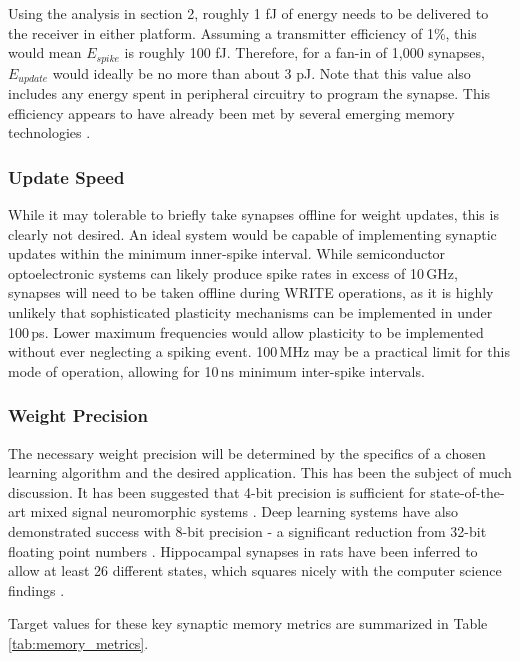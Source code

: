 \documentclass[twocolumn]{article}
\begin{document}
Using the analysis in section 2, roughly 1 fJ of energy needs to be delivered to the receiver in either platform. Assuming a transmitter efficiency of 1\%, this would mean $E_{spike}$ is roughly 100 fJ. Therefore, for a fan-in of 1,000 synapses, $E_{update}$ would ideally be no more than about 3 pJ. Note that this value also includes any energy spent in peripheral circuitry to program the synapse. This efficiency appears to have already been met by several emerging memory technologies \cite{zahoor2020resistive}.

\subsubsection{Update Speed}
While it may tolerable to briefly take synapses offline for weight updates, this is clearly not desired. An ideal system would be capable of implementing synaptic updates within the minimum inner-spike interval. While semiconductor optoelectronic systems can likely produce spike rates in excess of 10\,GHz, synapses will need to be taken offline during WRITE operations, as it is highly unlikely that sophisticated plasticity mechanisms can be implemented in under 100\,ps. Lower maximum frequencies would allow plasticity to be implemented without ever neglecting a spiking event. 100\,MHz may be a practical limit for this mode of operation, allowing for 10\,ns minimum inter-spike intervals.

\subsubsection{Weight Precision}
The necessary weight precision will be determined by the specifics of a chosen learning algorithm and the desired application. This has been the subject of much discussion. It has been suggested that 4-bit precision is sufficient for state-of-the-art mixed signal neuromorphic systems \cite{pfeil20124}. Deep learning systems have also demonstrated success with 8-bit precision - a significant reduction from 32-bit floating point numbers \cite{wang2018training}. Hippocampal synapses in rats have been inferred to allow at least 26 different states, which squares nicely with the computer science findings \cite{bartol2015nanoconnectomic}. 

Target values for these key synaptic memory metrics are summarized in Table \ref{tab:memory_metrics}.
\end{document}
